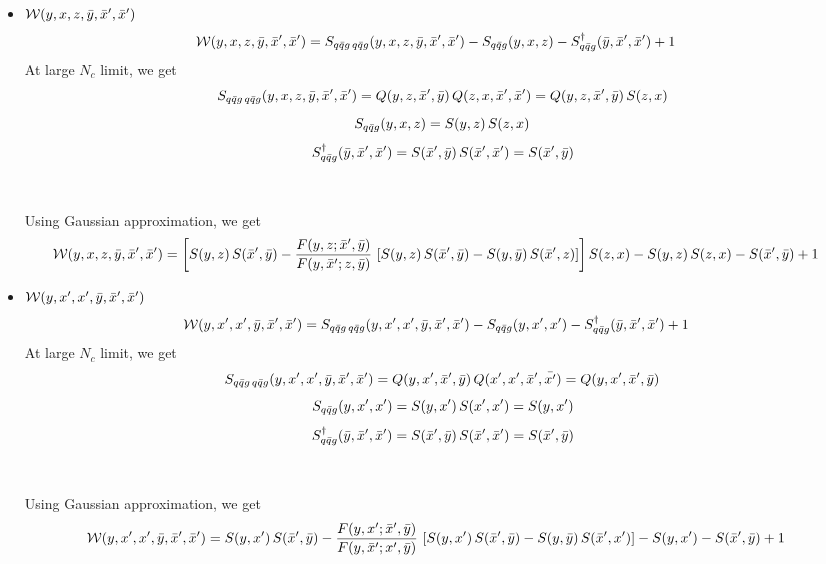 \documentclass[9pt]{article}
\numberwithin{equation}{section}
\begin{document}
\begin{itemize}
Using Gaussian approximation, we get
\begin{align}
    \mathcal{W}(y,x',x',\Bar{y},\Bar{x},\Bar{z}) &  = \left[S(y,x')\,S(\Bar{z},\Bar{y}) - \frac{F(y,x';\Bar{z},\Bar{y})}{F(y,\Bar{z};x',\Bar{y})}\, \left[S(y,x')\,S(\Bar{z},\Bar{y})-S(y,\Bar{y})\,S(\Bar{z},x')\right]\right] S(\Bar{x},\Bar{z}) -  S(y,x') - S(\Bar{z},\Bar{y})\, S(\Bar{x},\Bar{z}) +1
\end{align}
\item $\mathcal{W}(y,x,z,\Bar{y},\Bar{x}',\Bar{x}')$
\begin{align}
        \mathcal{W}(y,x,z,\Bar{y},\Bar{x}',\Bar{x}') & = S_{q\Bar{q}g\,q\Bar{q}g}(y,x,z,\Bar{y},\Bar{x}',\Bar{x}') -S_{q\Bar{q}g}(y,x,z) - S^{\dagger}_{q\Bar{q}g}(\Bar{y},\Bar{x}',\Bar{x}') + 1
    \end{align}
At large $N_{c}$ limit, we get
$$S_{q\Bar{q}g\,q\Bar{q}g}(y,x,z,\Bar{y},\Bar{x}',\Bar{x}') = Q(y,z,\Bar{x}',\Bar{y})\, Q(z,x,\Bar{x}',\Bar{x}') = Q(y,z,\Bar{x}',\Bar{y})\, S(z,x) $$
$$S_{q\Bar{q}g}(y,x,z) = S(y,z)\, S(z,x)$$
$$S^{\dagger}_{q\Bar{q}g}(\Bar{y},\Bar{x}',\Bar{x}') = S(\Bar{x}',\Bar{y})\, S(\Bar{x}',\Bar{x}') = S(\Bar{x}',\Bar{y})$$
\\ \\ 
Using Gaussian approximation, we get
\begin{align}
    \mathcal{W}(y,x,z,\Bar{y},\Bar{x}',\Bar{x}') & = \left[S(y,z)\,S(\Bar{x}',\Bar{y}) - \frac{F(y,z;\Bar{x}',\Bar{y})}{F(y,\Bar{x}';z,\Bar{y})}\, \left[S(y,z)\,S(\Bar{x}',\Bar{y})-S(y,\Bar{y})\, S(\Bar{x}',z)\right]\right]S(z,x) - S(y,z)\, S(z,x) - S(\Bar{x}',\Bar{y}) + 1
\end{align}
\item $\mathcal{W}(y,x',x',\Bar{y},\Bar{x}',\Bar{x}')$
    \begin{align}
        \mathcal{W}(y,x',x',\Bar{y},\Bar{x}',\Bar{x}') & = S_{q\Bar{q}g\,q\Bar{q}g}(y,x',x',\Bar{y},\Bar{x}',\Bar{x}') -S_{q\Bar{q}g}(y,x',x') - S^{\dagger}_{q\Bar{q}g}(\Bar{y},\Bar{x}',\Bar{x}') + 1
    \end{align}
At large $N_{c}$ limit, we get
$$S_{q\Bar{q}g\,q\Bar{q}g}(y,x',x',\Bar{y},\Bar{x}',\Bar{x}') = Q(y,x',\Bar{x}',\Bar{y})\, Q(x',x',\Bar{x}',\Bar{x'}) = Q(y,x',\Bar{x}',\Bar{y}) $$
$$S_{q\Bar{q}g}(y,x',x') = S(y,x')\, S(x',x') = S(y,x')$$
$$S^{\dagger}_{q\Bar{q}g}(\Bar{y},\Bar{x}',\Bar{x}') = S(\Bar{x}',\Bar{y})\, S(\Bar{x}',\Bar{x}') = S(\Bar{x}',\Bar{y})$$ 
\\ \\ 
Using Gaussian approximation, we get
\begin{align}
    \mathcal{W}(y,x',x',\Bar{y},\Bar{x}',\Bar{x}') & = S(y,x')\,S(\Bar{x}',\Bar{y}) - \frac{F(y,x';\Bar{x}',\Bar{y})}{F(y,\Bar{x}';x',\Bar{y})}\, \left[S(y,x')\,S(\Bar{x}',\Bar{y})-S(y,\Bar{y})\, S(\Bar{x}',x')\right] - S(y,x') -  S(\Bar{x}',\Bar{y}) +1
\end{align}
\end{itemize}
\end{document}

